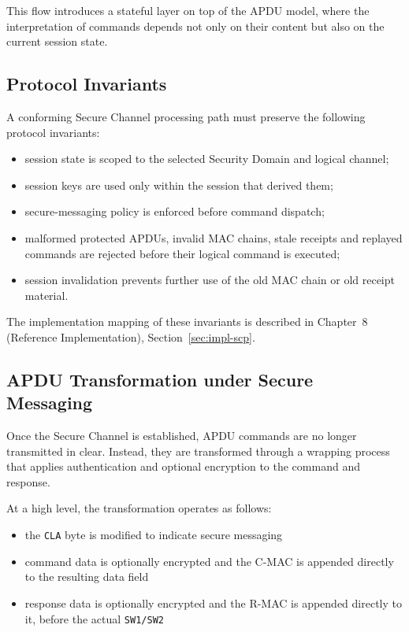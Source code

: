 This flow introduces a stateful layer on top of the APDU model, where the
interpretation of commands depends not only on their content but also on the
current session state.

\subsection{Protocol Invariants}

A conforming Secure Channel processing path must preserve the following
protocol invariants:

\begin{itemize}
\item session state is scoped to the selected Security Domain and logical
      channel;
\item session keys are used only within the session that derived them;
\item secure-messaging policy is enforced before command dispatch;
\item malformed protected APDUs, invalid MAC chains, stale receipts and replayed
      commands are rejected before their logical command is executed;
\item session invalidation prevents further use of the old MAC chain or old
      receipt material.
\end{itemize}

The implementation mapping of these invariants is described in Chapter~8
(Reference Implementation), Section~\ref{sec:impl-scp}.

\subsection{APDU Transformation under Secure Messaging}

Once the Secure Channel is established, APDU commands are no longer transmitted
in clear.  Instead, they are transformed through a wrapping process that
applies authentication and optional encryption to the command and response.

At a high level, the transformation operates as follows:
\begin{itemize}
\item the \texttt{CLA} byte is modified to indicate secure messaging
\item command data is optionally encrypted and the C-MAC is appended directly
      to the resulting data field
\item response data is optionally encrypted and the R-MAC is appended directly
      to it, before the actual \texttt{SW1/SW2}
\end{itemize}

